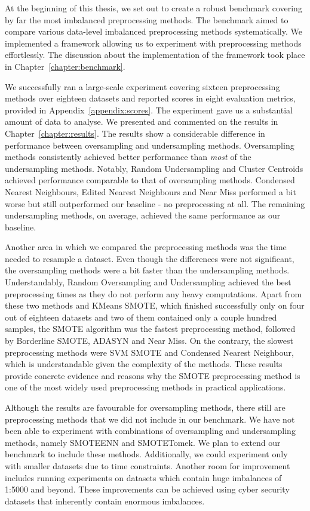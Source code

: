 
At the beginning of this thesis, we set out to create a robust benchmark covering by far the most
imbalanced preprocessing methods. The benchmark aimed to compare various data-level imbalanced
preprocessing methods systematically. We implemented a framework allowing us to experiment with
preprocessing methods effortlessly. The discussion about the implementation of the framework took
place in Chapter~\ref{chapter:benchmark}.

We successfully ran a large-scale experiment covering sixteen preprocessing methods over eighteen
datasets and reported scores in eight evaluation metrics, provided in
Appendix~\ref{appendix:scores}. The experiment gave us a substantial amount of data to analyse. We
presented and commented on the results in Chapter~\ref{chapter:results}. The results show a
considerable difference in performance between oversampling and undersampling methods.
Oversampling methods consistently achieved better performance than \emph{most} of the undersampling
methods. Notably, Random Undersampling and Cluster Centroids achieved performance comparable to
that of oversampling methods. Condensed Nearest Neighbours, Edited Nearest Neighbours and Near Miss
performed a bit worse but still outperformed our baseline - no preprocessing at all. The remaining
undersampling methods, on average, achieved the same performance as our baseline.

Another area in which we compared the preprocessing methods was the time needed to resample a
dataset. Even though the differences were not significant, the oversampling methods were a bit
faster than the undersampling methods. Understandably, Random Oversampling and Undersampling
achieved the best preprocessing times as they do not perform any heavy computations. Apart from
these two methods and KMeans SMOTE, which finished successfully only on four out of eighteen
datasets and two of them contained only a couple hundred samples, the SMOTE algorithm was the
fastest preprocessing method, followed by Borderline SMOTE, ADASYN and Near Miss. On the contrary,
the slowest preprocessing methods were SVM SMOTE and Condensed Nearest Neighbour, which is
understandable given the complexity of the methods. These results provide concrete evidence and
reasons why the SMOTE preprocessing method is one of the most widely used preprocessing methods in
practical applications.

Although the results are favourable for oversampling methods, there still are preprocessing methods
that we did not include in our benchmark. We have not been able to experiment with combinations of
oversampling and undersampling methods, namely SMOTEENN and SMOTETomek. We plan to extend our
benchmark to include these methods. Additionally, we could experiment only with smaller datasets
due to time constraints. Another room for improvement includes running experiments on datasets
which contain huge imbalances of 1:5000 and beyond. These improvements can be achieved using cyber
security datasets that inherently contain enormous imbalances.
